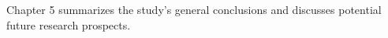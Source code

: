 Chapter 5 summarizes the study's general conclusions and discusses potential future research prospects.


